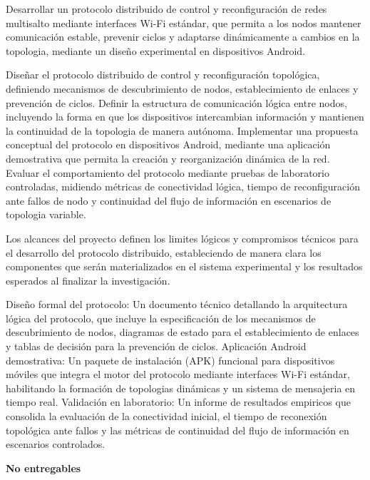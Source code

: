 \newpage
{}


Desarrollar un protocolo distribuido de control y reconfiguración de redes multisalto mediante interfaces Wi-Fi estándar, que permita a los nodos mantener comunicación estable, prevenir ciclos y adaptarse dinámicamente a cambios en la topologia, mediante un diseño experimental en dispositivos Android.


Diseñar el protocolo distribuido de control y reconfiguración topológica, definiendo mecanismos de descubrimiento de nodos, establecimiento de enlaces y prevención de ciclos. Definir la estructura de comunicación lógica entre nodos, incluyendo la forma en que los dispositivos intercambian información y mantienen la continuidad de la topologia de manera autónoma. Implementar una propuesta conceptual del protocolo en dispositivos Android, mediante una aplicación demostrativa que permita la creación y reorganización dinámica de la red. Evaluar el comportamiento del protocolo mediante pruebas de laboratorio controladas, midiendo métricas de conectividad lógica, tiempo de reconfiguración ante fallos de nodo y continuidad del flujo de información en escenarios de topologia variable.


Los alcances del proyecto definen los limites lógicos y compromisos técnicos para el desarrollo del protocolo distribuido, estableciendo de manera clara los componentes que serán materializados en el sistema experimental y los resultados esperados al finalizar la investigación.

Diseño formal del protocolo: Un documento técnico detallando la arquitectura lógica del protocolo, que incluye la especificación de los mecanismos de descubrimiento de nodos, diagramas de estado para el establecimiento de enlaces y tablas de decisión para la prevención de ciclos. Aplicación Android demostrativa: Un paquete de instalación (APK) funcional para dispositivos móviles que integra el motor del protocolo mediante interfaces Wi-Fi estándar, habilitando la formación de topologias dinámicas y un sistema de mensajeria en tiempo real. Validación en laboratorio: Un informe de resultados empiricos que consolida la evaluación de la conectividad inicial, el tiempo de reconexión topológica ante fallos y las métricas de continuidad del flujo de información en escenarios controlados.

\textbf{No entregables}

